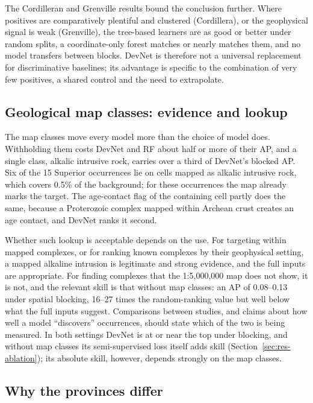 \documentclass[pdflatex,sn-apa]{sn-jnl}
\begin{document}
The Cordilleran and Grenville results bound the conclusion further. Where positives are comparatively plentiful and clustered (Cordillera), or the geophysical signal is weak (Grenville), the tree-based learners are as good or better under random splits, a coordinate-only forest matches or nearly matches them, and no model transfers between blocks. DevNet is therefore not a universal replacement for discriminative baselines; its advantage is specific to the combination of very few positives, a shared control and the need to extrapolate.

\subsection{Geological map classes: evidence and lookup}\label{sec:disc-mapclasses}

The map classes move every model more than the choice of model does. Withholding them costs DevNet and RF about half or more of their AP, and a single class, alkalic intrusive rock, carries over a third of DevNet's blocked AP. Six of the 15 Superior occurrences lie on cells mapped as alkalic intrusive rock, which covers 0.5\% of the background; for these occurrences the map already marks the target. The age-contact flag of the containing cell partly does the same, because a Proterozoic complex mapped within Archean crust creates an age contact, and DevNet ranks it second.

Whether such lookup is acceptable depends on the use. For targeting within mapped complexes, or for ranking known complexes by their geophysical setting, a mapped alkaline intrusion is legitimate and strong evidence, and the full inputs are appropriate. For finding complexes that the 1:5,000,000 map does not show, it is not, and the relevant skill is that without map classes: an AP of 0.08--0.13 under spatial blocking, 16--27 times the random-ranking value but well below what the full inputs suggest. Comparisons between studies, and claims about how well a model ``discovers'' occurrences, should state which of the two is being measured. In both settings DevNet is at or near the top under blocking, and without map classes its semi-supervised loss itself adds skill (Section~\ref{sec:res-ablation}); its absolute skill, however, depends strongly on the map classes.

\subsection{Why the provinces differ}\label{sec:disc-provinces}
\end{document}
